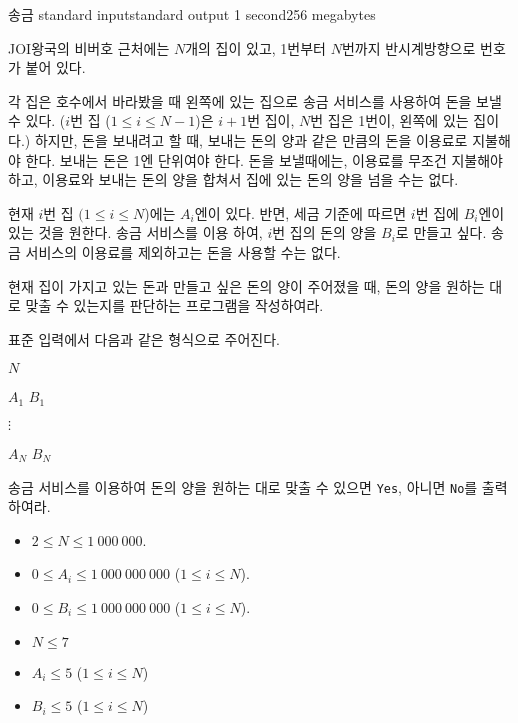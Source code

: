 \begin{problem}{송금}
	{standard input}{standard output}
	{1 second}{256 megabytes}{}
	
	JOI왕국의 비버호 근처에는 $N$개의 집이 있고, 1번부터 $N$번까지 반시계방향으로 번호가 붙어 있다.
	
	각 집은 호수에서 바라봤을 때 왼쪽에 있는 집으로 송금 서비스를 사용하여 돈을 보낼 수 있다. ($i$번 집 ($1 \le i \le N-1$)은 $i+1$번 집이, $N$번 집은 1번이, 왼쪽에 있는 집이다.) 하지만, 돈을 보내려고 할 때, 보내는 돈의 양과 같은 만큼의 돈을 이용료로 지불해야 한다. 보내는 돈은 1엔 단위여야 한다. 돈을 보낼때에는, 이용료를 무조건 지불해야 하고, 이용료와 보내는 돈의 양을 합쳐서 집에 있는 돈의 양을 넘을 수는 없다.
	
	현재 $i$번 집 $(1 \le i \le N$)에는 $A_i$엔이 있다. 반면, 세금 기준에 따르면 $i$번 집에 $B_i$엔이 있는 것을 원한다. 송금 서비스를 이용 하여, $i$번 집의 돈의 양을 $B_i$로 만들고 싶다. 송금 서비스의 이용료를 제외하고는 돈을 사용할 수는 없다.
	
	현재 집이 가지고 있는 돈과 만들고 싶은 돈의 양이 주어졌을 때, 돈의 양을 원하는 대로 맞출 수 있는지를 판단하는 프로그램을 작성하여라.
	
	\InputFile
	
	표준 입력에서 다음과 같은 형식으로 주어진다.
	
	$N$
	
	$A_1$ $B_1$
	
	$\vdots$
	
	$A_N$ $B_N$
	
	\OutputFile
	
	송금 서비스를 이용하여 돈의 양을 원하는 대로 맞출 수 있으면 \texttt{Yes}, 아니면 \texttt{No}를 출력하여라.
	
	\Constraints

	\begin{itemize}
		
		\item $2 \le N \le 1\ 000\ 000$.
		\item $0 \le A_i \le 1\ 000\ 000\ 000$ ($1 \le i \le N$).
		\item $0 \le B_i \le 1\ 000\ 000\ 000$ ($1 \le i \le N$).
		
	\end{itemize}
	
	
	\begin{itemize}
		\item $N \le 7$
		\item $A_i \le 5$ ($1 \le i \le N$)
		\item $B_i \le 5$ ($1 \le i \le N$)
	\end{itemize}
	

\end{problem}
